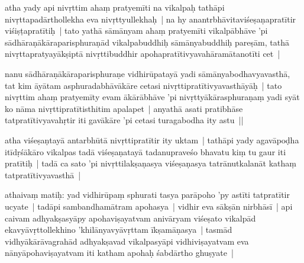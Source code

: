 \documentclass[article,a4paper]{memoir}
\begin{document}
	  \pstart atha yady api nivṛttim ahaṃ pratyemī\-ti na vikalpaḥ tathā\-pi nivṛttapadā\-rthollekha eva nivṛttyullekhaḥ | na hy anantrbhā\-vitaviśeṣaṇapratī\-tir viśiṣṭapratī\-tiḥ | tato yathā\- sā\-mā\-nyam ahaṃ pratyemī\-ti vikalpā\-bhā\-ve 'pi sā\-dhā\-raṇā\-kā\-raparisphuraṇā\-d vikalpabuddhiḥ sā\-mā\-nyabuddhiḥ pareṣā\-m, tathā\- nivṛttapratyayā\-kṣiptā\- nivṛttibuddhir apohapratī\-tivyavahā\-ramā\-tanotī\-ti cet |
	\pend
      

	  \pstart nanu sā\-dhā\-raṇā\-kā\-raparisphuraṇe vidhirū\-patayā\- yadi sā\-mā\-nyabodhavyavasthā\-, tat kim ā\-yā\-tam asphuradabhā\-vā\-kā\-re cetasi nivṛttipratī\-tivyavasthā\-yā\-ḥ | tato nivṛttim ahaṃ pratyemī\-ty evam ā\-kā\-rā\-bhā\-ve 'pi nivṛttyā\-kā\-rasphuraṇaṃ yadi syā\-t ko nā\-ma nivṛttipratī\-tisthitim apalapet | anyathā\- asati pratibhā\-se tatpratī\-tivyavahṛtir iti gavā\-kā\-re 'pi cetasi turagabodha ity astu ||
	\pend
      

	  \pstart atha viśeṣaṇtayā\- antarbhū\-tā\- nivṛttipratī\-tir ity uktam | tathā\-pi yady agavā\-poḍha itī\-dṛśā\-kā\-ro vikalpas tadā\- viśeṣaṇatayā\- tadanupraveśo bhavatu kiṃ tu gaur iti pratī\-tiḥ | tadā\- ca sato 'pi nivṛttilakṣaṇasya viśeṣaṇasya tatrā\-nutkalanā\-t kathaṃ tatpratī\-tivyavasthā\- |
	\pend
      

	  \pstart athaivaṃ matiḥ: yad vidhirū\-paṃ sphurati tasya parā\-poho 'py astī\-ti tatpratī\-tir ucyate | tadā\-pi sambandhamā\-tram apohasya | vidhir eva sā\-kṣā\-n nirbhā\-sī\- | api caivam adhyakṣasyā\-py apohaviṣayatvam anivā\-ryam viśeṣato vikalpā\-d ekavyā\-vṛttollekhino 'khilā\-nyavyā\-vṛttam ī\-kṣamā\-ṇasya | tasmā\-d vidhyā\-kā\-rā\-vagrahā\-d adhyakṣavad vikalpasyā\-pi vidhiviṣayatvam eva nā\-nyā\-pohaviṣayatvam iti katham apohaḥ śabdā\-rtho ghuṣyate | 
	\pend
      
\end{document}
